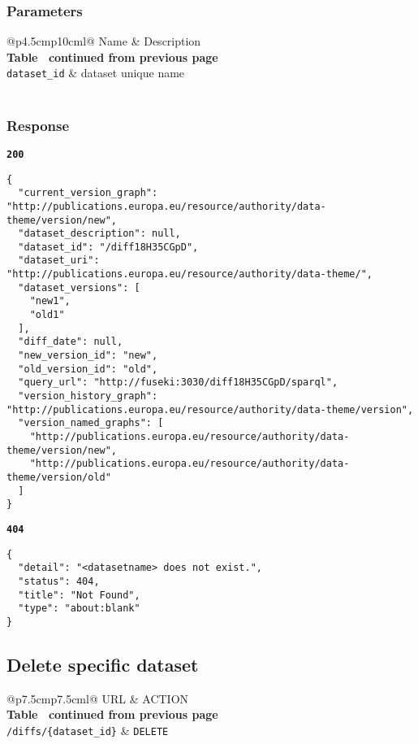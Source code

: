 \subsubsection{Parameters}
\begin{longtable}[c]{@{}p{4.5cm}p{10cm}l@{}}
  \toprule
  Name                 & Description                          \\* \midrule
  \endfirsthead
  \multicolumn{3}{c}%
  {{\bfseries Table \thetable\ continued from previous page}} \\
  \endhead
  \bottomrule
  \endfoot
  \endlastfoot
  \texttt{dataset\_id} & dataset unique name                  \\* \bottomrule
  \label{tab:rdf-differ-get-diff-parameters}                  \\
\end{longtable}

\subsubsection{Response}
\textbf{\texttt{200}}
\begin{lstlisting}
{
  "current_version_graph": "http://publications.europa.eu/resource/authority/data-theme/version/new",
  "dataset_description": null,
  "dataset_id": "/diff18H35CGpD",
  "dataset_uri": "http://publications.europa.eu/resource/authority/data-theme/",
  "dataset_versions": [
    "new1",
    "old1"
  ],
  "diff_date": null,
  "new_version_id": "new",
  "old_version_id": "old",
  "query_url": "http://fuseki:3030/diff18H35CGpD/sparql",
  "version_history_graph": "http://publications.europa.eu/resource/authority/data-theme/version",
  "version_named_graphs": [
    "http://publications.europa.eu/resource/authority/data-theme/version/new",
    "http://publications.europa.eu/resource/authority/data-theme/version/old"
  ]
}
\end{lstlisting}

\textbf{\texttt{404}}
\begin{lstlisting}
{
  "detail": "<datasetname> does not exist.",
  "status": 404,
  "title": "Not Found",
  "type": "about:blank"
}
\end{lstlisting}

\subsection{Delete specific dataset}

\begin{longtable}[c]{@{}p{7.5cm}p{7.5cm}l@{}}
  \toprule
  URL                             & ACTION                    \\* \midrule
  \endfirsthead
  \multicolumn{3}{c}%
  {{\bfseries Table \thetable\ continued from previous page}} \\
  \endhead
  \bottomrule
  \endfoot
  \endlastfoot
  \texttt{/diffs/\{dataset\_id\}} & \texttt{DELETE}           \\* \bottomrule
  \label{tab:rdf-differ-delete-diffs}                         \\
\end{longtable}

